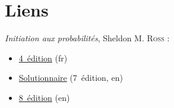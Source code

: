 \chapter*{Liens}

\emph{Initiation aux probabilités}, Sheldon M. \textsc{Ross} :
\begin{itemize}
	\item \href{https://docplayer.fr/2602735-Initiation-aux-probabilites.html}{4\ieme{}~édition} (fr)
	\item \href{https://www.studocu.com/row/document/yildiz-teknik-ueniversitesi/ergonomi/lecture-notes/a-first-course-in-probability-7ed-solution-manual-prentice-hall-147s-sheldon-ross/7242179/view}{Solutionnaire} (7\ieme{}~édition, en)
	\item \href{http://julio.staff.ipb.ac.id/files/2015/02/Ross_8th_ed_English.pdf}{8\ieme{}~édition} (en)
\end{itemize}
